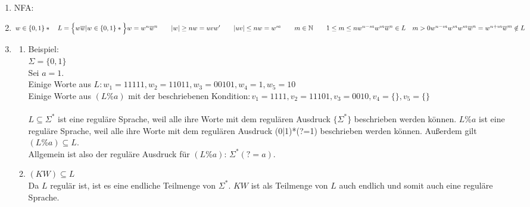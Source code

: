 \documentclass[a4paper]{scrartcl}
\title{\titleinfo}
\author{Arne Feil}
\date{\today}
\newcommand{\aufgabe}[1]{\item[\textbf{#1}]}
\begin{document}
\begin{enumerate}
\aufgabe{2.3}
NFA:\\
\aufgabe{2.4}
$w \in \{0,1\}* \quad L=\Big\{w\overline{w} | w \in \{0,1\}* \Big\} \\
w = w^n \overline{w}^n \quad \quad |w| \geq n \\
w = uvw' \quad \quad |uv| \leq n \\
w = w^m \quad \quad m \in \mathbb{N} \quad \quad 1 \leq m \leq n \\
w^{n-m}w^m\overline{w}^n \in L \quad m>0 \\
w^{n-m} w^m w^m \overline{w}^n = w^{n+m}\overline{w}^m \notin L$

\aufgabe{2.5}
\begin{enumerate}[1.]
\item
Beispiel: \\
\(\Sigma = \{0, 1\}\) \\
Sei \(a = 1\). \\
Einige Worte aus \(L: w_1 = 11111, w_2 = 11011, w_3 = 00101, w_4 = 1, w_5 = 10\) \\
Einige Worte aus \((L\%a)\) mit der beschriebenen Kondition\(: v_1 = 1111, v_2 = 11101, v_3 = 0010, v_4 = \{\}, v_5 = \{\}\) \\
\\
\(L \subseteq \Sigma^*\) ist eine reguläre Sprache, weil alle ihre Worte mit
dem regulären Ausdruck \(\{\Sigma^*\}\) beschrieben werden können. \(L\%a\) ist
eine reguläre Sprache, weil alle ihre Worte mit dem regulären Ausdruck (0|1)*(?=1)
beschrieben werden können. Außerdem gilt \((L\%a) \subseteq L \).\\
Allgemein ist also der reguläre Ausdruck für \((L\%a)\): \(\Sigma^*(?=a)\).

\item
$(KW) \subseteq L$ \\
Da $L$ regulär ist, ist es eine endliche Teilmenge von $\Sigma^*$. $KW$ ist als 
Teilmenge von $L$ auch endlich und somit auch eine reguläre Sprache.
\end{enumerate}
\end{enumerate}
\end{document}
